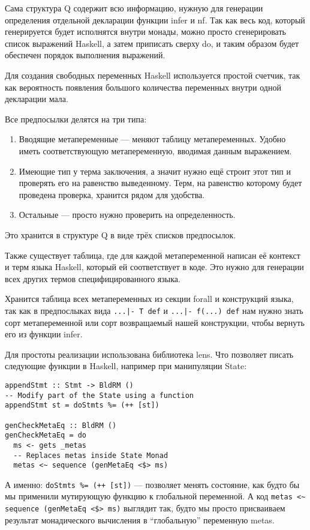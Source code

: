 Сама структура Q содержит всю информацию, нужную для генерации определения отдельной декларации функции infer и nf. Так как весь код, который генерируется будет исполнятся внутри монады, можно просто сгенерировать список выражений Haskell, а затем приписать сверху do, и таким образом будет обеспечен порядок выполнения выражений.

Для создания свободных переменных Haskell используется простой счетчик, так как вероятность появления большого количества переменных внутри одной декларации мала.

Все предпосылки делятся на три типа:
\begin{enumerate}
  \item Вводящие метапеременные --- меняют таблицу метапеременных. Удобно иметь соответствующую метапеременную, вводимая данным выражением.
  \item Имеющие тип у терма заключения, а значит нужно ещё строит этот тип и проверять его на равенство выведенному. Терм, на равенство которому будет проведена проверка, хранится рядом для удобства.
  \item Остальные --- просто нужно проверить на определенность.
\end{enumerate}

Это хранится в структуре Q в виде трёх списков предпосылок.

Также существует таблица, где для каждой метапеременной написан её контекст и терм языка Haskell, который ей соответствует в коде. Это нужно для генерации всех других термов специфицированного языка.

Хранится таблица всех метапеременных из секции forall и конструкций языка, так как в предпослыках вида \lstinline{...|- T def} и \lstinline{...|- f(...) def} нам нужно знать сорт метапеременной или сорт возвращаемый нашей конструкции, чтобы вернуть его из функции infer.

Для простоты реализации использована библиотека lens\cite{lens}. Что позволяет писать следующие функции в Haskell, например при манипуляции State:

\begin{lstlisting}[frame=single]
appendStmt :: Stmt -> BldRM ()
-- Modify part of the State using a function
appendStmt st = doStmts %= (++ [st])

genCheckMetaEq :: BldRM ()
genCheckMetaEq = do
  ms <- gets _metas
  -- Replaces metas inside State Monad
  metas <~ sequence (genMetaEq <$> ms)
\end{lstlisting}

А именно: \lstinline{doStmts %= (++ [st])} --- позволяет менять состояние, как будто бы мы применили мутирующую функцию к глобальной переменной. А код \lstinline{metas <~ sequence (genMetaEq <$> ms)} выглядит так, будто мы просто присваиваем результат монадического вычисления в ``глобальную'' переменную metas.











